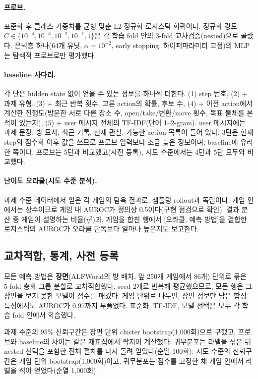 \documentclass[11pt]{article}
\begin{document}
\paragraph{프로브.} 표준화 후 클래스 가중치를 균형 맞춘 L2 정규화 로지스틱 회귀이다.
정규화 강도 $C \in \{10^{-4}, 10^{-3}, 10^{-2}, 10^{-1}, 1\}$은 각 학습 fold 안의 3-fold 교차검증(nested)으로 골랐다.
은닉층 하나(64개 유닛, $\alpha = 10^{-2}$, early stopping, 하이퍼파라미터 고정)의 MLP는 탐색적 프로브로만 평가했다.

\paragraph{baseline 사다리.} 각 단은 hidden state 없이 얻을 수 있는 정보를 하나씩 더한다.
(1) step 번호, (2) + 과제 유형, (3) + 최근 반복 횟수, 고른 action의 확률, 후보 수,
(4) + 이전 action에서 계산한 진행도(방문한 서로 다른 장소 수, open/take/변환/move 횟수, 목표 물체를 본 적이 있는지),
(5) + user 메시지 전체의 TF-IDF(단어 1--2-gram). user 메시지에는 과제 문장, 방 묘사, 최근 기록, 현재 관찰, 가능한 action 목록이 들어 있다.
3단은 현재 step의 점수화 이후 값을 쓰므로 프로브 입력보다 조금 늦은 정보이며, baseline에 유리한 쪽이다.
프로브는 5단과 비교했고(사전 등록), 시도 수준에서는 4단과 5단 모두와 비교했다.

\paragraph{난이도 오라클(시도 수준 분석).} 과제 수준 데이터에서 얻은 각 게임의 탐욕 결과로, 샘플링 rollout과 독립이다.
게임 안에서는 상수이므로 게임 내 AUROC가 정의상 0.5이다(구현 점검으로 확인).
결과 분산 중 게임이 설명하는 비율($\eta^2$)과, 게임을 합친 행에서 [오라클, 예측 방법]을 결합한 로지스틱의 AUROC가 오라클 단독보다 얼마나 높은지도 보고한다.

\subsection{교차적합, 통계, 사전 등록}\label{sec:stats}
모든 예측 방법은 \textbf{장면}(ALFWorld의 방 배치, 앞 250개 게임에서 86개) 단위로 묶은 5-fold 층화 그룹 분할로 교차적합했다.
seed 2개로 반복해 평균했으므로, 모든 행은 그 장면을 보지 못한 모델이 점수를 매겼다. 게임 단위로 나누면, 장면 정보만 담은 합성 특징에서도 AUROC가 0.97까지 부풀었다.
표준화, TF-IDF, 모델 선택은 모두 각 학습 fold 안에서 학습했다.

과제 수준의 95\% 신뢰구간은 장면 단위 cluster bootstrap(1,000회)으로 구했고, 프로브와 baseline의 차이는 같은 재표집에서 짝지어 계산했다.
귀무분포는 라벨을 섞은 뒤 nested 선택을 포함한 전체 절차를 다시 돌려 얻었다(순열 100회).
시도 수준의 신뢰구간은 게임 단위 bootstrap(1,000회)이고, 귀무분포는 점수를 고정한 채 게임 안에서 라벨을 섞어 얻었다(순열 1,000회).
\end{document}
